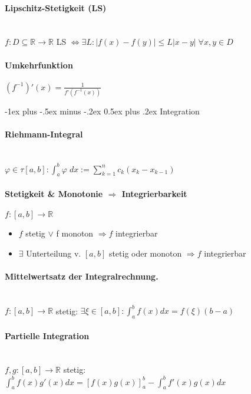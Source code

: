 \documentclass[paper=a3,paper=landscape, fontsize=9pt, DIV=30]{scrartcl}
\makeatletter
\newcommand{\real}{{\mathbb{R}}}
\renewcommand{\section}{\@startsection{section}{1}{0mm}%
  {-1ex plus -.5ex minus -.2ex}%
  {0.5ex plus .2ex}%
  {\color{blue}\normalfont\large\bfseries}}
\makeatother
\begin{document}
\begin{multicols*}{4}
  \paragraph{Lipschitz-Stetigkeit (LS)}\hspace{0pt}\\
  $f : D \subseteq \real  \rightarrow \real$ LS $\Leftrightarrow \exists L: \lvert f(x) - f(y) \rvert \leq L \lvert x-y \rvert  \; \forall x,y \in D$ 
  
  \paragraph{Umkehrfunktion}
  $\displaystyle (f^{-1})'(x) = \frac{1}{f'(f^{-1}(x))}$
  
  \section{Integration}


  \paragraph{Riehmann-Integral}\hspace{0pt}\\
  $\varphi \in \tau [a,b]: \int_{a}^{b}\varphi \; dx := \sum_{k=1}^{n}c_k(x_k-x_{k-1})$


  \paragraph{Stetigkeit \& Monotonie $\Rightarrow$ Integrierbarkeit} $f: [a,b] \rightarrow \real$
  \begin{itemize}
  \item $f$ stetig $\vee$ f monoton $\Rightarrow f$ integrierbar
  \item $\exists$ Unterteilung v. $[a,b]$ stetig oder monoton $\Rightarrow f$ integrierbar
  \end{itemize}


  \paragraph{Mittelwertsatz der Integralrechnung.}\hspace{0pt}\\
  $f:[a,b] \rightarrow \real$ stetig: $\exists \xi \in [a,b]: \int_{a}^{b}f(x)dx=f(\xi)(b-a)$


  \paragraph{Partielle Integration}\hspace{0pt}\\
  $f,g: [a,b] \rightarrow \real$ stetig: $\int_{a}^{b}f(x)g'(x)dx=[f(x)g(x)]_a^b-\int_{a}^{b}f'(x)g(x) dx$



\end{multicols*}
\end{document}
